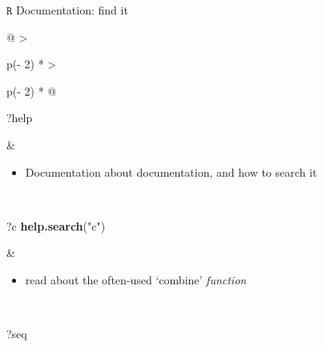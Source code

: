 \documentclass[
  11pt,
  ignorenonframetext,
]{beamer}
\newenvironment{Shaded}{\begin{snugshade}}{\end{snugshade}}
\newcommand{\FunctionTok}[1]{\textcolor[rgb]{0.13,0.29,0.53}{\textbf{#1}}}
\newcommand{\NormalTok}[1]{#1}
\newcommand{\StringTok}[1]{\textcolor[rgb]{0.31,0.60,0.02}{#1}}
\providecommand{\tightlist}{%
  \setlength{\itemsep}{0pt}\setlength{\parskip}{0pt}}
\newlength\ShadedFrameSep
\begin{document}
\begin{frame}[fragile]{\(\texttt{R}\) Documentation: find it}
\protect\hypertarget{textttr-documentation-find-it}{}
\begin{longtable}[]{@{}
  >{\raggedright\arraybackslash}p{(\columnwidth - 2\tabcolsep) * }
  >{\raggedright\arraybackslash}p{(\columnwidth - 2\tabcolsep) * }@{}}
\toprule\noalign{}
\endhead
\begin{minipage}[t]{\linewidth}\raggedright
\vspace{-\ShadedFrameSep}{}

\begin{Shaded}
\begin{Highlighting}[]
\NormalTok{?help}
\end{Highlighting}
\end{Shaded}
\end{minipage} & \begin{minipage}[t]{\linewidth}\raggedright
\begin{itemize}
\tightlist
\item
  Documentation about documentation, and how to search it
\end{itemize}
\end{minipage} \\
\begin{minipage}[t]{\linewidth}\raggedright
\vspace{-\ShadedFrameSep}{}

\begin{Shaded}
\begin{Highlighting}[]
\NormalTok{?c}
\FunctionTok{help.search}\NormalTok{(}\StringTok{"c"}\NormalTok{)}
\end{Highlighting}
\end{Shaded}
\end{minipage} & \begin{minipage}[t]{\linewidth}\raggedright
\begin{itemize}
\tightlist
\item
  read about the often-used `combine' \emph{function}
\end{itemize}
\end{minipage} \\
\begin{minipage}[t]{\linewidth}\raggedright
\vspace{-\ShadedFrameSep}{}

\begin{Shaded}
\begin{Highlighting}[]
\NormalTok{?seq}
\end{Highlighting}
\end{Shaded}


\end{minipage}
\end{longtable}
\end{frame}
\end{document}
